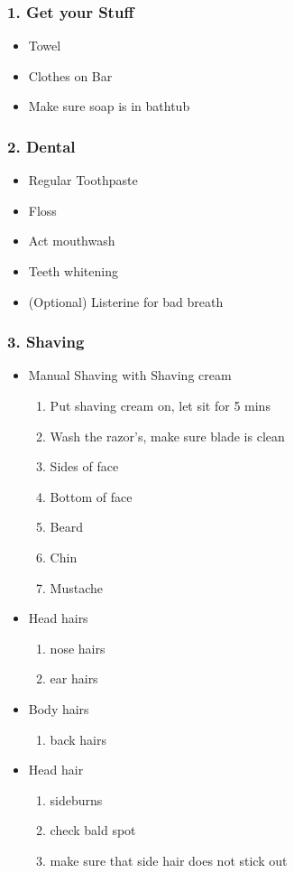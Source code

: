 \begin{frame}
\frametitle{1. Get your Stuff}
\begin{itemize}
\item Towel
\item Clothes on Bar
\item Make sure soap is in bathtub
\end{itemize}
\end{frame}

\begin{frame}
\frametitle{2. Dental}
\begin{itemize}
\item Regular Toothpaste
\item Floss
\item Act mouthwash
\item Teeth whitening
\item (Optional) Listerine for bad breath
\end{itemize}
\end{frame}


\begin{frame}
\frametitle{3. Shaving}

\begin{itemize}
\item Manual Shaving with Shaving cream
\begin{enumerate}
\item \tiny  Put shaving cream on, let sit for 5 mins
\item \tiny  Wash the razor's, make sure blade is clean
\item \tiny  Sides of face
\item \tiny  Bottom of face
\item \tiny  Beard
\item \tiny Chin
\item \tiny Mustache
\end{enumerate}
\item Head hairs
\begin{enumerate}
\item \tiny nose hairs
\item \tiny ear hairs
\end{enumerate}

\item Body hairs
\begin{enumerate}
\item \tiny back hairs
\end{enumerate}

\item Head hair
\begin{enumerate}
\item \tiny sideburns
\item \tiny check bald spot 
\item \tiny make sure that side hair does not stick out
\end{enumerate}
\end{itemize}

\end{frame}


